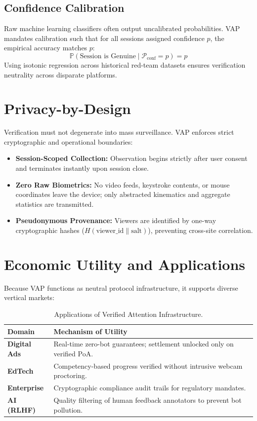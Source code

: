 \documentclass[10pt,twocolumn,letterpaper]{article}
\begin{document}
\subsection{Confidence Calibration}
Raw machine learning classifiers often output uncalibrated probabilities. VAP mandates calibration such that for all sessions assigned confidence $p$, the empirical accuracy matches $p$:
\begin{equation}
\mathbb{P}\left(\text{Session is Genuine} \mid \mathcal{P}_{\text{conf}} = p\right) = p
\end{equation}
Using isotonic regression across historical red-team datasets ensures verification neutrality across disparate platforms.

\section{Privacy-by-Design}
Verification must not degenerate into mass surveillance. VAP enforces strict cryptographic and operational boundaries:
\begin{itemize}
    \item \textbf{Session-Scoped Collection:} Observation begins strictly after user consent and terminates instantly upon session close.
    \item \textbf{Zero Raw Biometrics:} No video feeds, keystroke contents, or mouse coordinates leave the device; only abstracted kinematics and aggregate statistics are transmitted.
    \item \textbf{Pseudonymous Provenance:} Viewers are identified by one-way cryptographic hashes ($H(\text{viewer\_id} \parallel \text{salt})$), preventing cross-site correlation.
\end{itemize}

\section{Economic Utility and Applications}
Because VAP functions as neutral protocol infrastructure, it supports diverse vertical markets:

\begin{table}[h]
\centering
\small
\begin{tabular}{lp{4.7cm}}
\toprule
\textbf{Domain} & \textbf{Mechanism of Utility} \\
\midrule
\textbf{Digital Ads} & Real-time zero-bot guarantees; settlement unlocked only on verified PoA. \\
\textbf{EdTech} & Competency-based progress verified without intrusive webcam proctoring. \\
\textbf{Enterprise} & Cryptographic compliance audit trails for regulatory mandates. \\
\textbf{AI (RLHF)} & Quality filtering of human feedback annotators to prevent bot pollution. \\
\bottomrule
\end{tabular}
\caption{Applications of Verified Attention Infrastructure.}
\label{tab:apps}
\end{table}
\end{document}
